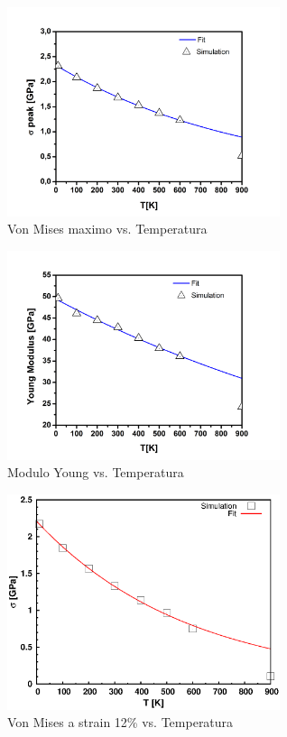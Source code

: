 \documentclass[10pt, oneside]{article} %
\begin{document}
\begin{figure}[H]
\centering
\includegraphics[width=8cm]{Figures/peakstress_T_TEN.png}
\caption{Von Mises maximo vs. Temperatura}
\end{figure}

\begin{figure}[H]
\centering
\includegraphics[width=8cm]{Figures/young_T_TEN.png}
\caption{Modulo Young vs. Temperatura}
\end{figure}

\begin{figure}[H]
\centering
\includegraphics[width=8cm]{Figures/12stress_T_TENS.eps}
\caption{Von Mises a strain 12\% vs. Temperatura}
\end{figure}
\end{document}
